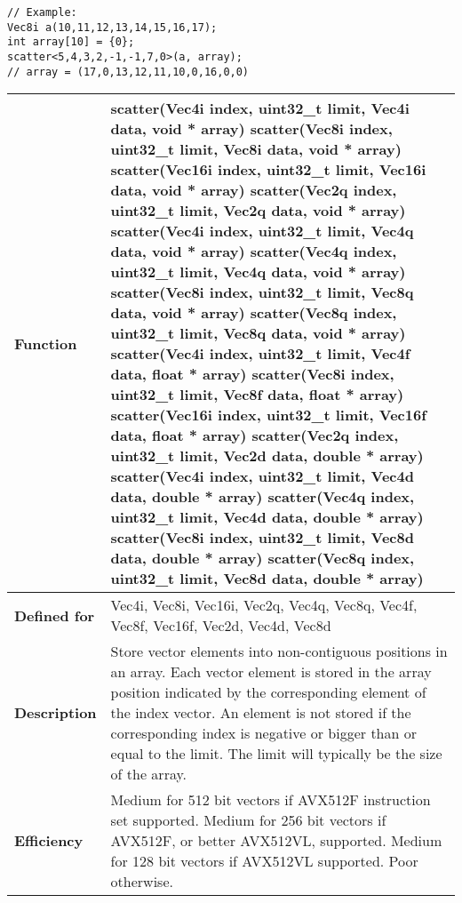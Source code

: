 \documentclass[vcl_manual.tex]{subfiles}
\begin{document}
\begin{lstlisting}[frame=none]
// Example:
Vec8i a(10,11,12,13,14,15,16,17);
int array[10] = {0};
scatter<5,4,3,2,-1,-1,7,0>(a, array);
// array = (17,0,13,12,11,10,0,16,0,0)
\end{lstlisting}


\begin{tabular}{|p{30mm}|p{120mm}|} \hline
\bfseries Function & 
scatter(Vec4i index, uint32\_t limit, Vec4i data, void * array) \newline
scatter(Vec8i index, uint32\_t limit, Vec8i data, void * array) \newline
scatter(Vec16i index, uint32\_t limit, Vec16i data, void * array) \newline
scatter(Vec2q index, uint32\_t limit, Vec2q data, void * array) \newline
scatter(Vec4i index, uint32\_t limit, Vec4q data, void * array) \newline
scatter(Vec4q index, uint32\_t limit, Vec4q data, void * array) \newline
scatter(Vec8i index, uint32\_t limit, Vec8q data, void * array) \newline
scatter(Vec8q index, uint32\_t limit, Vec8q data, void * array) \newline
scatter(Vec4i index, uint32\_t limit, Vec4f data, float * array) \newline
scatter(Vec8i index, uint32\_t limit, Vec8f data, float * array) \newline
scatter(Vec16i index, uint32\_t limit, Vec16f data, float * array) \newline
scatter(Vec2q index, uint32\_t limit, Vec2d data, double * array) \newline
scatter(Vec4i index, uint32\_t limit, Vec4d data, double * array) \newline
scatter(Vec4q index, uint32\_t limit, Vec4d data, double * array) \newline
scatter(Vec8i index, uint32\_t limit, Vec8d data, double * array) \newline
scatter(Vec8q index, uint32\_t limit, Vec8d data, double * array) \\ \hline
\bfseries Defined for & 
Vec4i, Vec8i, Vec16i, Vec2q, Vec4q, Vec8q, \newline
Vec4f, Vec8f, Vec16f, Vec2d, Vec4d, Vec8d \\ \hline
\bfseries Description & Store vector elements into non-contiguous positions in an array. Each vector element is stored in the array position indicated by the corresponding element of the index vector. An element is not stored if the corresponding index is negative or bigger than or equal to the limit. The limit will typically be the size of the array. \\ \hline
\bfseries Efficiency & 
Medium for 512 bit vectors if AVX512F instruction set supported. \newline
Medium for 256 bit vectors if AVX512F, or better AVX512VL, supported. \newline
Medium for 128 bit vectors if AVX512VL supported. \newline
Poor otherwise. \\ \hline
\end{tabular}
\end{document}
